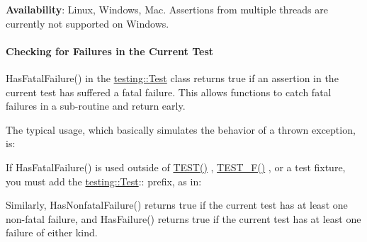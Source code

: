 {\bfseries{Availability}}\+: Linux, Windows, Mac. Assertions from multiple threads are currently not supported on Windows.

\paragraph*{Checking for Failures in the Current Test}

{\ttfamily Has\+Fatal\+Failure()} in the {\ttfamily \mbox{\hyperlink{classtesting_1_1_test}{testing\+::\+Test}}} class returns {\ttfamily true} if an assertion in the current test has suffered a fatal failure. This allows functions to catch fatal failures in a sub-\/routine and return early.


\begin{DoxyCode}{0}
\DoxyCodeLine{\};}
\end{DoxyCode}


The typical usage, which basically simulates the behavior of a thrown exception, is\+:


\begin{DoxyCode}{0}
\DoxyCodeLine{}
\DoxyCodeLine{\}}
\end{DoxyCode}


If {\ttfamily Has\+Fatal\+Failure()} is used outside of {\ttfamily \mbox{\hyperlink{googletest-master_2googletest_2include_2gtest_2gtest_8h_ab5540a6d621853916be8240ff51819cf}{T\+E\+S\+T()}}} , {\ttfamily \mbox{\hyperlink{googletest-master_2googletest_2include_2gtest_2gtest_8h_a0ee66d464d1a06c20c1929cae09d8758}{T\+E\+S\+T\+\_\+\+F()}}} , or a test fixture, you must add the {\ttfamily \mbox{\hyperlink{classtesting_1_1_test}{testing\+::\+Test}}\+:\+:} prefix, as in\+:


\begin{DoxyCode}{0}
\end{DoxyCode}


Similarly, {\ttfamily Has\+Nonfatal\+Failure()} returns {\ttfamily true} if the current test has at least one non-\/fatal failure, and {\ttfamily Has\+Failure()} returns {\ttfamily true} if the current test has at least one failure of either kind.

